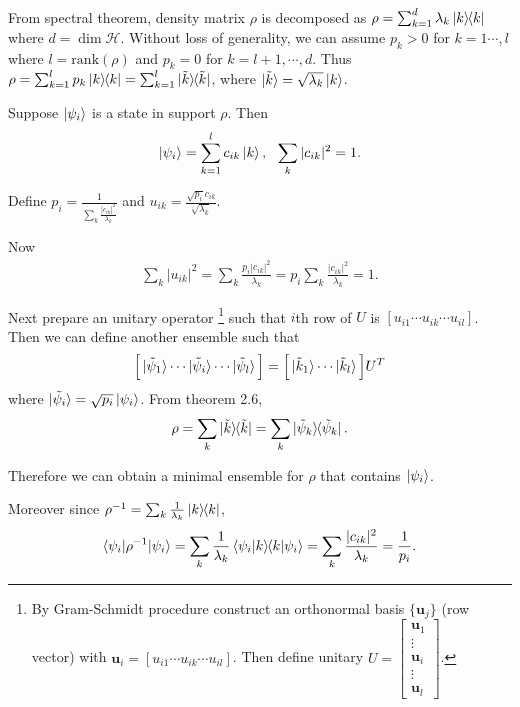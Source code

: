 From spectral theorem, density matrix $\rho$ is decomposed as $\rho = \sum_{k=1}^{d} \lambda_k \ket{k}\hspace{-1mm} \bra{k}$ where $d = \dim \mathcal{H}$.
Without loss of generality, we can assume $p_k > 0$ for $k = 1 \cdots , l$ where $l = \mathrm{rank} (\rho)$ and $p_k = 0$ for $k = l+1, \cdots, d$.
Thus $\rho = \sum_{k=1}^{l} p_k \ket{k}\hspace{-1mm} \bra{k} = \sum_{k=1}^{l} \ket{\tilde{k}}\hspace{-1mm} \bra{\tilde{k}}$, where $\ket{\tilde{k}} = \sqrt{\lambda_k} \ket{k}$.

Suppose $\ket{\psi_i}$ is a state in support $\rho$. Then
\begin{align*}
	\ket{\psi_i} = \sum_{k=1}^l c_{ik} \ket{k}, ~~ \sum_k |c_{ik}|^2 = 1.
\end{align*}

Define $\displaystyle p_i = \frac{1}{\sum_k \frac{|c_{ik}|^2}{\lambda_k} }$ and $\displaystyle u_{ik} = \frac{\sqrt{p_i} c_{ik}}{\sqrt{\lambda_k}}$.

Now
\begin{align*}
	\sum_k |u_{ik}|^2 = \sum_k \frac{p_i | c_{ik} |^2 }{\lambda_k} = p_i \sum_k \frac{| c_{ik} |^2 }{\lambda_k} = 1.
\end{align*}

Next prepare an unitary operator
\footnote{By Gram-Schmidt procedure construct an orthonormal basis $\{\boldsymbol{u}_j\}$ (row vector) with $\boldsymbol{u}_i = [u_{i1} \cdots u_{ik} \cdots u_{il}]$. Then define unitary $U = \begin{bmatrix}
    \boldsymbol{u}_1 \\
    \vdots \\
    \boldsymbol{u}_i \\
    \vdots \\
    \boldsymbol{u}_l
    \end{bmatrix}$.}
such that $i$th row of $U$ is $[u_{i1} \cdots u_{ik} \cdots u_{il}]$.
Then we can define another ensemble such that
\begin{align*}
	\Big[  \ket{\tilde{\psi}_1} \cdots  \ket{\tilde{\psi}_i} \cdots \ket{\tilde{\psi}_l}\Big] = \Big[ \ket{\tilde{k}_1} \cdots \ket{\tilde{k}_l} \Big] U^T
\end{align*}
where $\ket{\tilde{\psi_i}} = \sqrt{p_i} \ket{\psi_i}$.
From theorem 2.6,
\begin{align*}
	\rho = \sum_k \ket{\tilde{k}}\hspace{-1mm} \bra{\tilde{k}} = \sum_k \ket{\tilde{\psi}_k}\hspace{-1mm} \bra{\tilde{\psi}_k}.
\end{align*}

Therefore we can obtain a minimal ensemble for $\rho$ that contains $\ket{\psi_i}$.

Moreover since $\rho^{-1} = \sum_k \frac{1}{\lambda_k} \ket{k}\hspace{-1mm} \bra{k}$,
\begin{align*}
	\braket{\psi_i | \rho^{-1} | \psi_i} = \sum_k \frac{1}{\lambda_k} \braket{\psi_i | k} \hspace{-1mm} \braket{k | \psi_i} = \sum_k \frac{|c_{ik}|^2}{\lambda_k} = \frac{1}{p_i}.
\end{align*}

